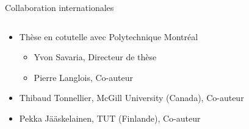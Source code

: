 \documentclass[t,compress,mathserif,12pt,xcolor=dvipsnames]{beamer}
\begin{document}
\begin{frame}[t]{Collaboration internationales}
  \begin{minipage}[t][5.0cm][t]{\textwidth}
    \begin{columns}[T]
      \begin{column}{0.63\textwidth}
        \begin{itemize}
          \item<+-> Thèse en cotutelle avec Polytechnique Montréal
          \begin{itemize}
          \item<1-> Yvon Savaria, Directeur de thèse
          \item<1-> Pierre Langlois, Co-auteur
          \end{itemize}
          \item<+-> Thibaud Tonnellier, McGill University (Canada), Co-auteur
          \item<+-> Pekka Jääskelainen, TUT (Finlande), Co-auteur
        \end{itemize}      \end{column}
      \begin{column}{0.04\textwidth}
      \end{column}
      \begin{column}{0.33\textwidth}
      \centering

\end{column}
\end{columns}
\end{minipage}
\end{frame}
\end{document}
